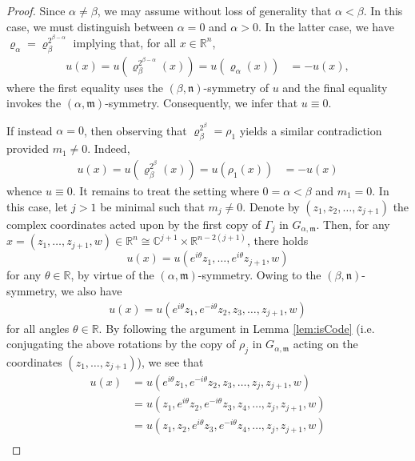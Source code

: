 \documentclass[10pt,a4paper]{amsart}
\newcommand{\CC}{\mathbb{C}}
\newcommand{\RR}{\mathbb{R}}
\newcommand{\m}{\mathfrak{m}}
\newcommand{\n}{\mathfrak{n}}
\begin{document}
	\begin{proof}
		Since $\alpha \ne \beta$, we may assume without loss of generality that $\alpha < \beta$. In this case, we must distinguish between $\alpha = 0$ and $\alpha > 0$. In the latter case, we have 
		\(
		\varrho_\alpha = \varrho_{\beta}^{2^{\beta-\alpha}}
		\)
		implying that, for all $x \in \RR^n$, 
		\begin{align*}
			u(x) = u(\varrho_{\beta}^{2^{\beta-\alpha}}(x))
			= u(\varrho_\alpha(x))
			&= -u(x),
		\end{align*}
		where the first equality uses the $(\beta,\n)$-symmetry of $u$ and the final equality invokes the $(\alpha,\m)$-symmetry. Consequently, we infer that $u \equiv 0$.
		
		If instead $\alpha = 0$, then observing that $\varrho_{\beta}^{2^{\beta}} = \rho_1$ yields a similar contradiction provided $m_1 \ne 0$. Indeed,
		\begin{align*}
			u(x) = u(\varrho_{\beta}^{2^{\beta}}(x))
			= u(\rho_1(x))
			&= -u(x)
		\end{align*}
		whence $u \equiv 0$.
		It remains to treat the setting where $0 = \alpha < \beta$ and $m_1 = 0$. In this case,  let $j > 1$ be minimal such that $m_j \ne 0$. Denote by $(z_1,z_2,\dots, z_{j+1})$ the complex coordinates acted upon by the first copy of $\Gamma_j$ in $G_{\alpha, \m}$. Then, for any $x = (z_1,\dots, z_{j+1}, w) \in \RR^n \cong \CC^{j+1} \times \RR^{n-2(j+1)}$, there holds
		\begin{equation}\label{eq:rotateAll}
			u(x) = u(e^{i\theta}z_1, \dots, e^{i\theta} z_{j+1}, w)
		\end{equation}
		for any $\theta \in \RR$, by virtue of the $(\alpha,\m)$-symmetry. Owing to the $(\beta, \n)$-symmetry, we also have
		\begin{align*}
			u(x) = u(e^{i\theta}z_1, e^{-i\theta} z_{2}, z_3, \dots, z_{j+1}, w)
		\end{align*}
		for all angles $\theta \in \RR$. By following the argument in Lemma \ref{lem:isCode} (i.e. conjugating the above rotations by the copy of $\rho_j$ in $G_{\alpha,\m}$ acting on the coordinates $(z_1,\dots,z_{j+1})$), we see that 
		\begin{align}
			u(x) &= u(e^{i\theta}z_1, e^{-i\theta} z_{2}, z_3, \dots, z_{j}, z_{j+1}, w) \tag{E.1}\\
			&= u(z_1, e^{i\theta} z_{2}, e^{-i\theta}z_3, z_4, \dots, z_{j}, z_{j+1}, w)\tag{E.2}\\
			&= u(z_1, z_2, e^{i\theta} z_{3}, e^{-i\theta}z_4, \dots, z_{j}, z_{j+1}, w)\tag{E.3}\\

\end{align}
\end{proof}
\end{document}
